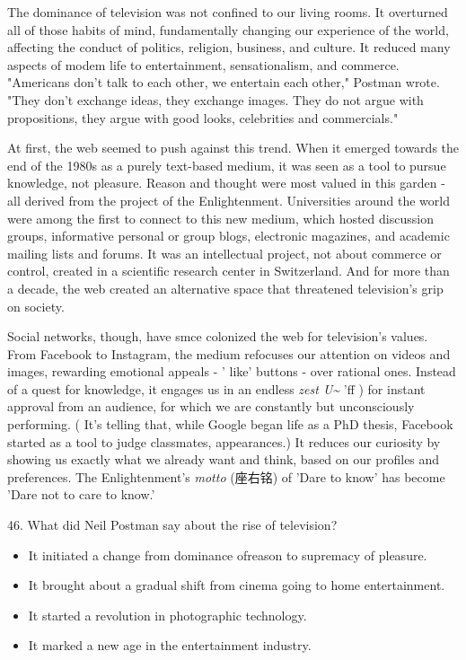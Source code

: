 \documentclass[UTF8,11pt]{ctexart}
\begin{document}
The dominance of television was not confined to our living rooms. It overturned all of those habits of mind, fundamentally changing our experience of the world, affecting the conduct of politics, religion, business, and culture. It reduced many aspects of modem life to entertainment, sensationalism, and commerce. "Americans don't talk to each other, we entertain each other," Postman wrote. "They don't exchange ideas, they exchange images. They do not argue with propositions, they argue with good looks, celebrities and commercials."


At first, the web seemed to push against this trend. When it emerged towards the end of the 1980s as a purely text-based medium, it was seen as a tool to pursue knowledge, not pleasure. Reason and thought were most valued in this garden - all derived from the project of the Enlightenment. Universities around the world were among the first to connect to this new medium, which hosted discussion groups, informative personal or group blogs, electronic magazines, and academic mailing lists and forums. It was an intellectual project, not about commerce or control, created in a scientific research center in Switzerland. And for more than a decade, the web created an alternative space that threatened television's grip on society.


Social networks, though, have smce colonized the web for television's values. From Facebook to Instagram, the medium refocuses our attention on videos and images, rewarding emotional appeals - ' like' buttons - over rational ones. Instead of a quest for knowledge, it engages us in an endless \textit{zest U\textasciitilde{} }'ff ) for instant approval from an audience, for which we are constantly but unconsciously performing. ( It's telling that, while Google began life as a PhD thesis, Facebook started as a tool to judge classmates, appearances.) It reduces our curiosity by showing us exactly what we already want and think, based on our profiles and preferences. The Enlightenment's \textit{motto }(座右铭) of 'Dare to know' has become 'Dare not to care to know.'


46. What did Neil Postman say about the rise of television?


\begin{itemize}[leftmargin=2em,itemsep=.2em,topsep=.4em]\item[A.] It initiated a change from dominance ofreason to supremacy of pleasure.
\item[B.] It brought about a gradual shift from cinema going to home entertainment.
\item[C.] It started a revolution in photographic technology.
\item[D.] It marked a new age in the entertainment industry.
\end{itemize}
\end{document}
